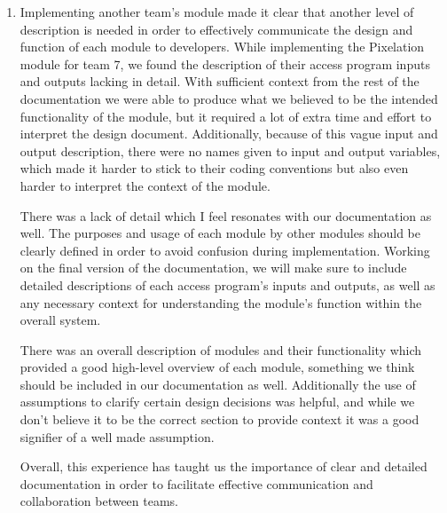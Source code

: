 \documentclass[12pt, titlepage]{article}
\begin{document}
\begin{enumerate}
  \item Implementing another team's module made it clear that another level of description is needed in order to effectively communicate the design and function of each module to developers. While implementing the Pixelation module for team 7, we found the description of their access program inputs and outputs lacking in detail. With sufficient context from the rest of the documentation we were able to produce what we believed to be the intended functionality of the module, but it required a lot of extra time and effort to interpret the design document. Additionally, because of this vague input and output description, there were no names given to input and output variables, which made it harder to stick to their coding conventions but also even harder to interpret the context of the module. 
  
  There was a lack of detail which I feel resonates with our documentation as well. The purposes and usage of each module by other modules should be clearly defined in order to avoid confusion during implementation. Working on the final version of the documentation, we will make sure to include detailed descriptions of each access program's inputs and outputs, as well as any necessary context for understanding the module's function within the overall system.

  There was an overall description of modules and their functionality which provided a good high-level overview of each module, something we think should be included in our documentation as well. Additionally the use of assumptions to clarify certain design decisions was helpful, and while we don't believe it to be the correct section to provide context it was a good signifier of a well made assumption.

  Overall, this experience has taught us the importance of clear and detailed documentation in order to facilitate effective communication and collaboration between teams.
\end{enumerate}
\end{document}
